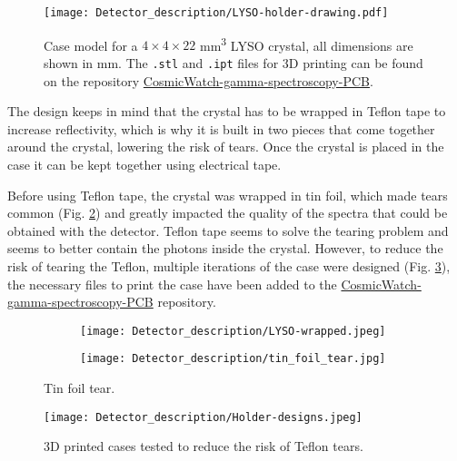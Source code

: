 \begin{figure}
    \centering
    \texttt{[image: Detector\_description/LYSO-holder-drawing.pdf]}
    \caption{Case model for a $4\times4\times22$ \unit{mm\cubed} LYSO crystal, all dimensions are shown in \unit{\mm}. The \texttt{.stl} and \texttt{.ipt} files for 3D printing can be found on the repository \href{https://github.com/anvargasl/CosmicWatch-gamma-spectroscopy-PCB}{CosmicWatch-gamma-spectroscopy-PCB}.}
    \label{fig:3d_case_desing}
\end{figure}

The design keeps in mind that the crystal has to be wrapped in Teflon tape to increase reflectivity, which is why it is built in two pieces that come together around the crystal, lowering the risk of tears. Once the crystal is placed in the case it can be kept together using electrical tape.

Before using Teflon tape, the crystal was wrapped in tin foil, which made tears common (Fig. \ref{fig:tin_foil_tear}) and greatly impacted the quality of the spectra that could be obtained with the detector. Teflon tape seems to solve the tearing problem and seems to better contain the photons inside the crystal. However, to reduce the risk of tearing the Teflon, multiple iterations of the case were designed (Fig. \ref{fig:3d_previous_desings}), the necessary files to print the case have been added to the \href{https://github.com/anvargasl/CosmicWatch-gamma-spectroscopy-PCB}{CosmicWatch-gamma-spectroscopy-PCB} repository.
\begin{figure}
    \centering
    \begin{subfigure}[t]{0.35\textwidth}
      \texttt{[image: Detector\_description/LYSO-wrapped.jpeg]}
    \end{subfigure}
    \begin{subfigure}[t]{0.35\textwidth}
      \texttt{[image: Detector\_description/tin\_foil\_tear.jpg]}
    \end{subfigure}
    \caption{\label{fig:tin_foil_tear}Tin foil tear.}
\end{figure}

\begin{figure}
    \centering
    \texttt{[image: Detector\_description/Holder-designs.jpeg]}
    \caption{3D printed cases tested to reduce the risk of Teflon tears.}
    \label{fig:3d_previous_desings}
\end{figure}
